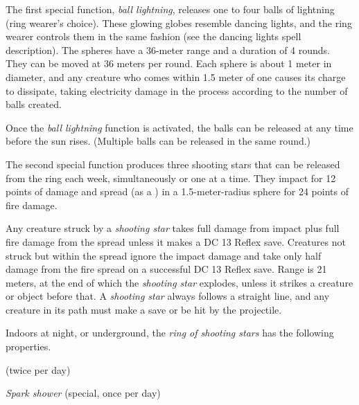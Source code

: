 The first special function, \emph{ball lightning}, releases one to four balls of lightning (ring wearer's choice). These glowing globes resemble dancing lights, and the ring wearer controls them in the same fashion (see the dancing lights spell description). The spheres have a 36-meter range and a duration of 4 rounds. They can be moved at 36 meters per round. Each sphere is about 1 meter in diameter, and any creature who comes within 1.5 meter of one causes its charge to dissipate, taking electricity damage in the process according to the number of balls created.


Once the \emph{ball lightning} function is activated, the balls can be released at any time before the sun rises. (Multiple balls can be released in the same round.)

The second special function produces three shooting stars that can be released from the ring each week, simultaneously or one at a time. They impact for 12 points of damage and spread (as a ) in a 1.5-meter-radius sphere for 24 points of fire damage.

Any creature struck by a \emph{shooting star} takes full damage from impact plus full fire damage from the spread unless it makes a DC 13 Reflex save. Creatures not struck but within the spread ignore the impact damage and take only half damage from the fire spread on a successful DC 13 Reflex save. Range is 21 meters, at the end of which the \emph{shooting star} explodes, unless it strikes a creature or object before that. A \emph{shooting star} always follows a straight line, and any creature in its path must make a save or be hit by the projectile.

Indoors at night, or underground, the \emph{ring of shooting stars} has the following properties.

\begin{itemize*}
\item {} (twice per day)
\item \emph{Spark shower} (special, once per day)
\end{itemize*}

